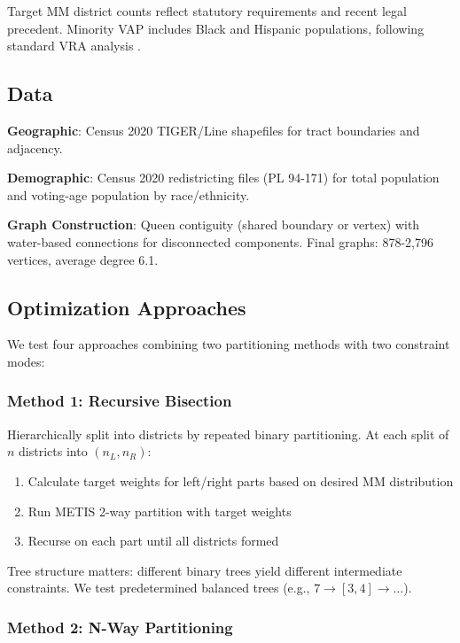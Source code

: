 Target MM district counts reflect statutory requirements and recent legal precedent. Minority VAP includes Black and Hispanic populations, following standard VRA analysis \citep{katz2020}.

\subsection{Data}

\textbf{Geographic}: Census 2020 TIGER/Line shapefiles for tract boundaries and adjacency.

\textbf{Demographic}: Census 2020 redistricting files (PL 94-171) for total population and voting-age population by race/ethnicity.

\textbf{Graph Construction}: Queen contiguity (shared boundary or vertex) with water-based connections for disconnected components. Final graphs: 878-2,796 vertices, average degree 6.1.

\subsection{Optimization Approaches}

We test four approaches combining two partitioning methods with two constraint modes:

\subsubsection{Method 1: Recursive Bisection}

Hierarchically split into districts by repeated binary partitioning. At each split of $n$ districts into $(n_L, n_R)$:

\begin{enumerate}
\item Calculate target weights for left/right parts based on desired MM distribution
\item Run METIS 2-way partition with target weights
\item Recurse on each part until all districts formed
\end{enumerate}

Tree structure matters: different binary trees yield different intermediate constraints. We test predetermined balanced trees (e.g., $7 \to [3,4] \to \ldots$).

\subsubsection{Method 2: N-Way Partitioning}

